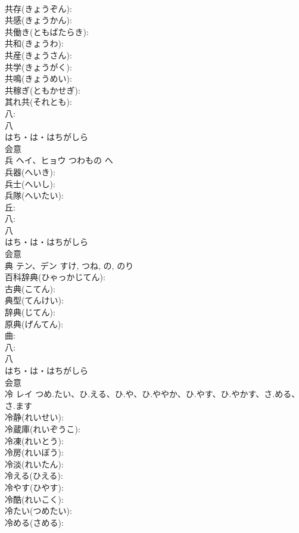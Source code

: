 \documentclass[8pt]{extreport}
\begin{document}
\begin{CJK}{UTF8}{min}
\\	共存(きょうぞん): 
\\	共感(きょうかん): 
\\	共働き(ともばたらき): 
\\	共和(きょうわ): 
\\	共産(きょうさん): 
\\	共学(きょうがく): 
\\	共鳴(きょうめい): 
\\	共稼ぎ(ともかせぎ): 
\\	其れ共(それとも): 
\\	八: 
\\	八	
\\	はち・は・はちがしら	
\\	会意 
\\	兵	ヘイ、ヒョウ	つわもの	へ	
\\	兵器(へいき): 
\\	兵士(へいし): 
\\	兵隊(へいたい): 
\\	丘: 
\\	八: 
\\	八	
\\	はち・は・はちがしら	
\\	会意 
\\	典	テン、デン		すけ, つね, の, のり	
\\	百科辞典(ひゃっかじてん): 
\\	古典(こてん): 
\\	典型(てんけい): 
\\	辞典(じてん): 
\\	原典(げんてん): 
\\	曲: 
\\	八: 
\\	八	
\\	はち・は・はちがしら	
\\	会意 
\\	冷	レイ	つめ.たい、ひ.える、ひ.や、ひ.ややか、ひ.やす、ひ.やかす、さ.める、さ.ます		
\\	冷静(れいせい): 
\\	冷蔵庫(れいぞうこ): 
\\	冷凍(れいとう): 
\\	冷房(れいぼう): 
\\	冷淡(れいたん): 
\\	冷える(ひえる): 
\\	冷やす(ひやす): 
\\	冷酷(れいこく): 
\\	冷たい(つめたい): 
\\	冷める(さめる): 

\end{CJK}
\end{document}
